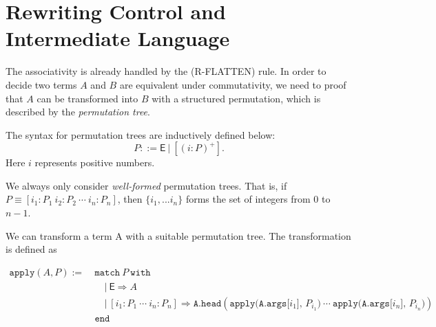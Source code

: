 \documentclass{article}
\begin{document}
\section{Rewriting Control and Intermediate Language}
The associativity is already handled by the (R-FLATTEN) rule. In order to decide two terms $A$ and $B$ are equivalent under commutativity, we need to proof that $A$ can be transformed into $B$ with a structured permutation, which is described by the \textit{permutation tree}.

\begin{definition}
    The syntax for permutation trees are inductively defined below:
    \[
    P ::= \mathsf{E}\ |\ [(i:P)^+].
    \]
    Here $i$ represents positive numbers.
\end{definition}
We always only consider \textit{well-formed} permutation trees. That is, if $P \equiv [i_1:P_1\ i_2:P_2\ \cdots\ i_n:P_n]$, then $\{i_1, ... i_n\}$ forms the set of integers from $0$ to $n-1$.

We can transform a term A with a suitable permutation tree. The transformation is defined as

\begin{align*}
    \texttt{apply}(A, P) :=\ & \texttt{match}\ P\ \texttt{with} \\
    & \quad |\ \textsf{E} \Rightarrow A \\
    & \quad |\ [i_1:P_1\ \cdots\ i_n:P_n] \Rightarrow \texttt{A.head}(\texttt{apply(A.args[$i_1$], $P_{i_1}$)}\ \cdots\ \texttt{apply(A.args[$i_n$], $P_{i_n}$)}) \\
    & \texttt{end}
\end{align*}


\end{document}
